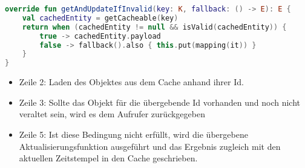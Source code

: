 \begin{minipage}{\linewidth} %
	\begin{lstlisting}[caption={Abstraktes Repository zum Caching von Daten}, label={lst:repository}, language=Kotlin]
override fun getAndUpdateIfInvalid(key: K, fallback: () -> E): E {
	val cachedEntity = getCacheable(key)
	return when (cachedEntity != null && isValid(cachedEntity)) {
		true -> cachedEntity.payload
		false -> fallback().also { this.put(mapping(it)) }
	}
}
	\end{lstlisting}
\end{minipage}

\begin{itemize}[noitemsep,nolistsep]
	\item Zeile 2: Laden des Objektes aus dem Cache anhand ihrer Id.
	\item Zeile 3: Sollte das Objekt für die übergebende Id  vorhanden und noch nicht veraltet sein, wird es dem Aufrufer zurückgegeben
	\item Zeile 5: Ist diese Bedingung nicht erfüllt, wird die übergebene Aktualisierungsfunktion ausgeführt und das Ergebnis zugleich mit den aktuellen Zeitstempel in den Cache geschrieben.
\end{itemize}


